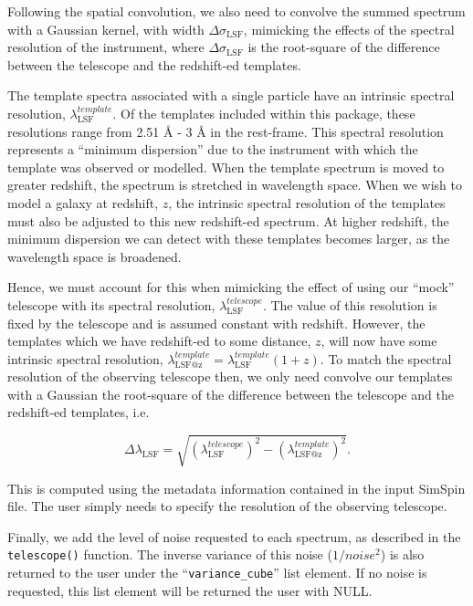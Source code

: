 \documentclass[
  journal=pasa,
  manuscript=research-paper, %
  year=2020,
  volume=37,
]{cup-journal}
\newcommand{\telescope}[1]{\texttt{telescope()}#1}
\begin{document}
Following the spatial convolution, we also need to convolve the summed spectrum with a Gaussian kernel, with width $\Delta \sigma_{\text{LSF}}$, mimicking the effects of the spectral resolution of the instrument, where $\Delta \sigma_{\text{LSF}}$ is the root-square of the difference between the telescope and the redshift-ed templates. 

The template spectra associated with a single particle have an intrinsic spectral resolution, $\lambda_{\text{LSF}}^{template}$. 
Of the templates included within this package, these resolutions range from 2.51 \AA{} - 3 \AA{} in the rest-frame.
This spectral resolution represents a ``minimum dispersion'' due to the instrument with which the template was observed or modelled. 
When the template spectrum is moved to greater redshift, the spectrum is stretched in wavelength space. 
When we wish to model a galaxy at redshift, $z$, the intrinsic spectral resolution of the templates must also be adjusted to this new redshift-ed spectrum. 
At higher redshift, the minimum dispersion we can detect with these templates becomes larger, as the wavelength space is broadened.

Hence, we must account for this when mimicking the effect of using our ``mock'' telescope with its spectral resolution, $\lambda_{\text{LSF}}^{telescope}$.
The value of this resolution is fixed by the telescope and is assumed constant with redshift. 
However, the templates which we have redshift-ed to some distance, $z$, will now have some intrinsic spectral resolution, $\lambda_{\text{LSF@z}}^{template} = \lambda_{\text{LSF}}^{template} (1 + z)$.
To match the spectral resolution of the observing telescope then, we only need convolve our templates with a Gaussian the root-square of the difference between the telescope and the redshift-ed templates, i.e. 

\begin{equation}
\Delta \lambda_{\text{LSF}} = \sqrt{(\lambda_{\text{LSF}}^{telescope})^2 - (\lambda_{\text{LSF@z}}^{template})^2}.
\label{eq:LSF}
\end{equation}

This is computed using the metadata information contained in the input SimSpin file. 
The user simply needs to specify the resolution of the observing telescope. 

Finally, we add the level of noise requested to each spectrum, as described in the \telescope{} function. 
The inverse variance of this noise ($1/noise^{2}$) is also returned to the user under the ``\texttt{variance\_cube}'' list element.
If no noise is requested, this list element will be returned the user with NULL. 
\end{document}
